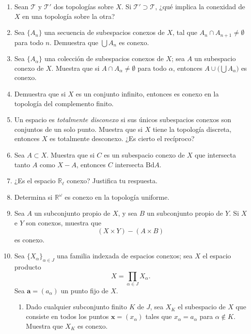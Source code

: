\documentclass[11pt]{article}
\begin{document}
\begin{enumerate}
    \item Sean $\mathcal{T}$ y $\mathcal{T}'$ dos topologías sobre $X$. Si $\mathcal{T}' \supset \mathcal{T}$, ¿qué implica la conexidad de $X$ en una topología sobre la otra?
    
    \item Sea $\{A_n\}$ una secuencia de subespacios conexos de $X$, tal que $A_n \cap A_{n+1} \neq \emptyset$ para todo $n$. Demuestra que $\bigcup A_n$ es conexo.
    
    \item Sea $\{A_\alpha\}$ una colección de subespacios conexos de $X$; sea $A$ un subespacio conexo de $X$. Muestra que si $A \cap A_\alpha \neq \emptyset$ para todo $\alpha$, entonces $A \cup \big(\bigcup A_\alpha\big)$ es conexo.
    
    \item Demuestra que si $X$ es un conjunto infinito, entonces es conexo en la topología del complemento finito.
    
    \item Un espacio es \textit{totalmente disconexo} si sus únicos subespacios conexos son conjuntos de un solo punto. Muestra que si $X$ tiene la topología discreta, entonces $X$ es totalmente desconexo. ¿Es cierto el recíproco?
    
    \item Sea $A \subset X$. Muestra que si $C$ es un subespacio conexo de $X$ que intersecta tanto $A$ como $X - A$, entonces $C$ intersecta $\mathrm{Bd} A$.
    
    \item ¿Es el espacio $\mathbb{R}_\ell$ conexo? Justifica tu respuesta.
    
    \item Determina si $\mathbb{R}^\omega$ es conexo en la topología uniforme.
    
    \item Sea $A$ un subconjunto propio de $X$, y sea $B$ un subconjunto propio de $Y$. Si $X$ e $Y$ son conexos, muestra que
    \[
    (X \times Y) - (A \times B)
    \]
    es conexo.

    \item Sea $\{X_\alpha\}_{\alpha \in J}$ una familia indexada de espacios conexos; sea $X$ el espacio producto
    \[
    X = \prod_{\alpha \in J} X_\alpha.
    \]
    Sea $\mathbf{a} = (a_\alpha)$ un punto fijo de $X$.
    \begin{enumerate}
        \item Dado cualquier subconjunto finito $K$ de $J$, sea $X_K$ el subespacio de $X$ que consiste en todos los puntos $\mathbf{x} = (x_\alpha)$ tales que $x_\alpha = a_\alpha$ para $\alpha \notin K$. Muestra que $X_K$ es conexo.
        

\end{enumerate}
\end{enumerate}
\end{document}
